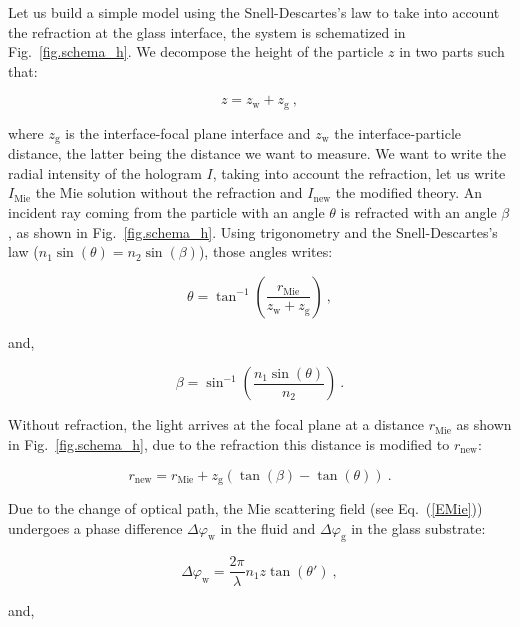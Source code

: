 Let us build a simple model using the Snell-Descartes’s law to take into account the refraction at the glass interface, the system is schematized in Fig.~\ref{fig.schema_h}. We decompose the height of the particle $z$ in two parts such that:

\begin{equation}
	z = z_\mathrm{w} + z_\mathrm{g} ~,
\end{equation}

where $z_\mathrm{g}$ is the interface-focal plane interface and $z_\mathrm{w}$ the interface-particle distance, the latter being the distance we want to measure. We want to write the radial intensity of the hologram $I$, taking into account the refraction, let us write  $I_\mathrm{Mie}$ the Mie solution without the refraction and $I_\mathrm{new}$ the modified theory. An incident ray coming from the particle with an angle $\theta$ is refracted with an angle $\beta$, as shown in Fig.~\ref{fig.schema_h}. Using trigonometry and the Snell-Descartes's law ($n_1 \sin(\theta)  = n_2 \sin(\beta)$), those angles writes:

\begin{equation}
	\theta = \tan ^{-1} \left( \frac{r_\mathrm{Mie}}{z_\mathrm{w} + z_\mathrm{g}}\right) ~,
\end{equation} 

and,

\begin{equation}
	\beta = \sin ^{-1} \left(\frac{n_1 \sin (\theta)}{n_2}\right) ~.
\end{equation}

Without refraction, the light arrives at the focal plane at a distance $r_\mathrm{Mie}$ as shown in Fig.~\ref{fig.schema_h}, due to the refraction this distance is modified to $r_\mathrm{new}$:

\begin{equation}
	r_\mathrm{new} = r_\mathrm{Mie} + z_\mathrm{g}(\tan(\beta) - \tan(\theta)) ~.
\end{equation}

Due to the change of optical path, the Mie scattering field (see Eq.~(\ref{EMie})) undergoes a phase difference $\Delta \varphi_\mathrm{w}$ in the fluid  and  $\Delta \varphi_\mathrm{g}$ in the glass substrate:

\begin{equation}
	\Delta \varphi_\mathrm{w} = \frac{2 \pi}{\lambda} n_1 z \tan(\theta ')~,
\end{equation}

and,


